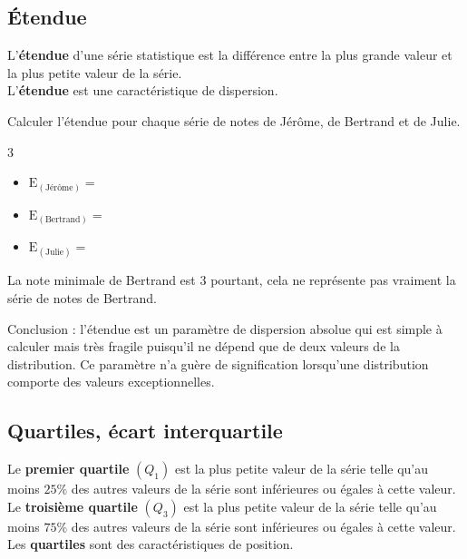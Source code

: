 \subsection{Étendue}

\begin{Définition}
L'{\bf{étendue}} d'une série statistique est la différence entre la plus grande valeur et la plus petite valeur de la série. \\
L'{\bf{étendue}} est une caractéristique de dispersion.

\end{Définition}

\noindent Calculer l'étendue pour chaque série de notes de Jérôme, de Bertrand et de Julie.

\begin{multicols}{3}
\begin{itemize}[label=\textbullet]
\item  $\text{E}_{(\text{Jérôme})} =$ \ligne
\item $\text{E}_{(\text{Bertrand})} =$ \ligne
\item $\text{E}_{(\text{Julie})} =$ \ligne
\end{itemize}
\end{multicols}

La note minimale de Bertrand est $3$ pourtant, cela ne représente pas vraiment la série de notes de Bertrand. 


\vspace{0.5cm}

\begin{Remarque}
Conclusion : l'étendue est un paramètre de dispersion absolue qui est simple à calculer mais très fragile puisqu'il ne dépend que de deux valeurs de la distribution. Ce paramètre n'a guère de signification lorsqu'une distribution comporte des valeurs exceptionnelles. 
\end{Remarque}

\newpage

\subsection{Quartiles, écart interquartile}
\begin{Définition}
Le {\bf{premier quartile}}  $(Q_1)$ est la plus petite valeur de la série telle qu'au moins $25 \%$ des autres valeurs de la série sont inférieures ou égales à cette valeur.\\
Le  {\bf{troisième quartile}} $(Q_3)$ est la plus petite valeur de la série telle qu'au moins $75 \%$ des autres valeurs de la série sont inférieures ou égales à cette valeur.\\
Les {\bf{quartiles}} sont des caractéristiques de position.

\end{Définition}

